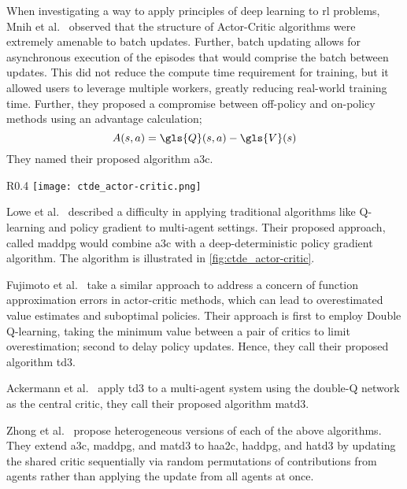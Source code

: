 When investigating a way to apply principles of deep learning to \gls{rl}
problems, Mnih et al.~\cite{mnih2016} observed that the structure of
Actor-Critic algorithms were extremely amenable to batch updates.
Further, batch updating allows for asynchronous execution of 
the episodes that would comprise the batch between updates.
This did not reduce the compute time requirement for training, 
but it allowed users to leverage multiple workers, 
greatly reducing real-world training time.
Further, they proposed a compromise between off-policy and on-policy
methods using an advantage calculation;
\begin{equation}
    A(s,a) = \gls{Q}(s,a) - \gls{V}(s)
\end{equation}
They named their proposed algorithm \gls{a3c}.

\begin{wrapfigure}[9]{R}{0.4\textwidth}
    \vspace*{-1em}
    \centering
    \texttt{[image: ctde\_actor-critic.png]}
    \caption{Actor-Critic \gls{ctde}.}
    \label{fig:ctde_actor-critic}
\end{wrapfigure}

Lowe et al.~\cite{lowe2020} described a difficulty in applying traditional 
algorithms like Q-learning and policy gradient to multi-agent settings.
Their proposed approach, called \gls{maddpg} would combine \gls{a3c} 
with a deep-deterministic policy gradient algorithm.
The algorithm is illustrated in \cref{fig:ctde_actor-critic}.

Fujimoto et al.~\cite{fujimoto2018} take a similar approach to address 
a concern of function approximation errors in actor-critic methods, 
which can lead to overestimated value estimates and suboptimal policies.
Their approach is first to employ Double Q-learning, taking the 
minimum value between a pair of critics to limit overestimation;
second to delay policy updates. 
Hence, they call their proposed algorithm \gls*{td3}.

Ackermann et al.~\cite{ackermann2019} apply \gls{td3} to 
a multi-agent system using the double-Q network as the central
critic, they call their proposed algorithm \gls{matd3}.

Zhong et al.~\cite{zhong2024} propose heterogeneous versions of each
of the above algorithms.
They extend \gls{a3c}, \gls{maddpg}, and \gls{matd3}
to \gls{haa2c}, \gls{haddpg}, and \gls{hatd3}
by updating the shared critic 
sequentially via random permutations of contributions from agents
rather than applying the update from all agents at once.

